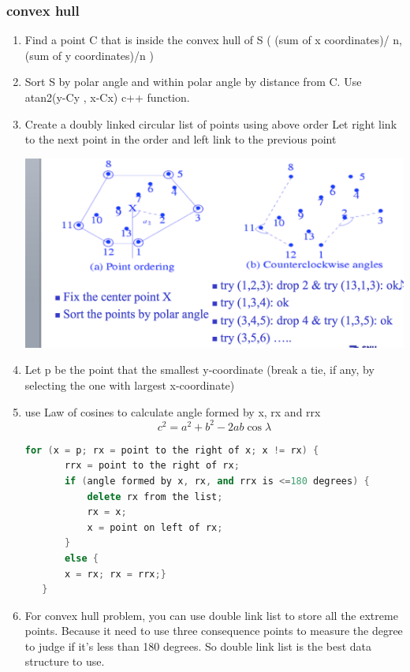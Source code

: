\documentclass[a4paper,12pt,twoside]{book}
\begin{document}
\subsubsection{convex hull}

\begin{enumerate}
\item Find a point C that is inside the convex hull of S
( (sum of x coordinates)/ n, (sum of y coordinates)/n )
\item Sort S by polar angle and within polar angle by distance from C. Use atan2(y-Cy , x-Cx) c++ function.
\item Create a doubly linked circular list of points using above order
Let right link to the next point in the order and left link to the previous point

\includegraphics[scale=0.4]{pics/convex.png} \newline
\item Let p be the point that the smallest y-coordinate 
   (break a tie, if any, by selecting the one with largest x-coordinate)
   
\item use Law of cosines to calculate  angle formed by x, rx and rrx
\[
c^{2} = a^{2}+b^{2}-2ab\cos\lambda
\]

\begin{lstlisting}[frame=single, language=c++]
 for (x = p; rx = point to the right of x; x != rx) {
       rrx = point to the right of rx;
       if (angle formed by x, rx, and rrx is <=180 degrees) {
           delete rx from the list;
           rx = x; 
           x = point on left of rx;
       } 
       else { 
       x = rx; rx = rrx;}
   } 
\end{lstlisting}

\item For convex hull problem, you can use double link list to store all the extreme points. Because it need to use three consequence points to measure the degree to judge if it's less than 180 degrees. So double link list is the best data structure to use. 

\end{enumerate}
\end{document}
